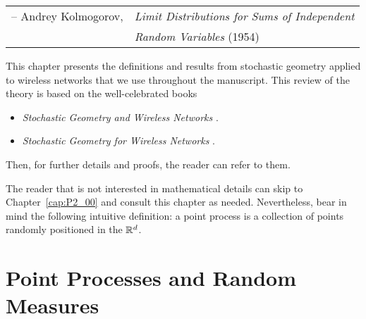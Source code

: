 %
{\begin{tabular}{ l l }
 -- Andrey Kolmogorov, &\textit{Limit Distributions for Sums of Independent } \\ 
    &\textit{Random Variables} (1954)
\end{tabular}}

This chapter presents the definitions and results from stochastic geometry applied to wireless networks that we use throughout the manuscript.
%
This review of the theory is based on the well-celebrated books
%
\begin{itemize}
    \item \textit{Stochastic Geometry and Wireless Networks} \cite{baccelli2010stochastic}.
    \item \textit{Stochastic Geometry for Wireless Networks} \cite{haenggi2012stochastic}.
\end{itemize}
%
Then, for further details and proofs, the reader can refer to them.

\begin{note}
    The reader that is not interested in mathematical details can skip to Chapter~\ref{cap:P2_00} and consult this chapter as needed.
    Nevertheless, bear in mind the following intuitive definition: a point process is a collection of points randomly positioned in the ${\mathbb R}^d$.
\end{note}
\newpage

\section{Point Processes and Random Measures} \label{sec:P1_03_01}

